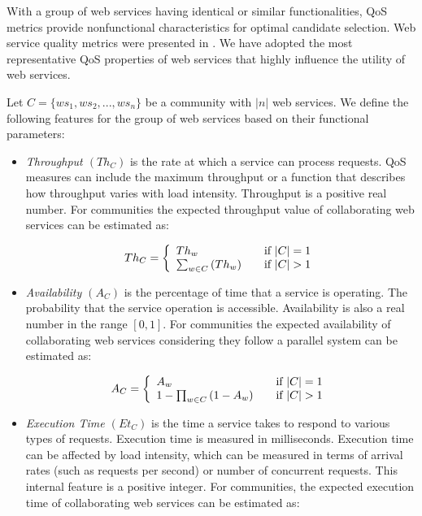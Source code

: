 \documentclass[10pt,journal,cspaper,compsoc]{IEEEtran}
\begin{document}
With a group of web services having identical or similar functionalities, QoS metrics provide nonfunctional characteristics for optimal candidate selection. Web service quality metrics were presented in \cite{Ardagna:2007:ASC:1263152.1263531,Menasce:2002:QIW:613357.613758,10.1109/ISSRE.2011.17}. We have adopted the most representative QoS properties of web services that highly influence the utility of web services. 

Let $C = \{ws_1,ws_2,..., ws_n\}$ be a community with $|n|$ web services. We define the following features for the group of web services based on their functional parameters:

\begin{itemize}

  \item \emph{Throughput $(Th_{C})$} is the rate at which a service can process requests. QoS measures can include the maximum throughput or a function that describes how throughput varies with load intensity. Throughput is a positive real number. For communities the expected throughput value of collaborating web services can be estimated as:
	
	\begin{equation}
		 Th_{C} = \left\{ 
			\begin{array}{l l}
				Th_{w} & \quad \text{if $|C| = 1$}\\
				\sum_{w \in C}{(Th_{w})} & \quad \text{if $|C| > 1$}
			\end{array} \right.
	\end{equation}
	
	\item \emph{Availability $(A_{C})$} is the percentage of time that a service is operating.
	The probability that the service operation is accessible. Availability is also a real number in the range $[0, 1]$. For communities the expected availability of collaborating web services considering they follow a parallel system can be estimated as:
	
	\begin{equation}
		A_{C} = \left\{ 
			\begin{array}{l l}
				A_{w} & \quad \text{if $|C| = 1$}\\
				1-\prod_{w \in C}{(1-A_{w})} & \quad \text{if $|C| > 1$}
			\end{array} \right.
	\end{equation}
	
	\item \emph{Execution Time $(Et_{C})$} is the time a service takes to respond to various types of requests. 
	Execution time is measured in milliseconds. Execution time can be affected by load intensity, which can be measured in terms of arrival rates (such as requests per second) or number of concurrent requests. This internal feature is a positive integer. For communities, the expected execution time of collaborating web services can be estimated as:
	

\end{itemize}
\end{document}
